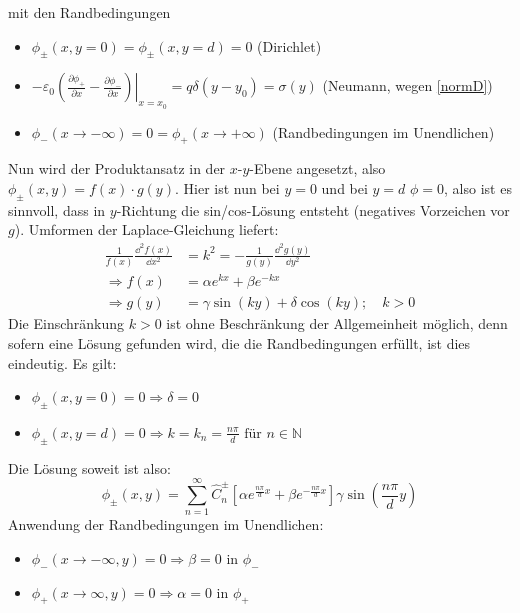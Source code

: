 		   mit den Randbedingungen
		        \begin{itemize}
			        \item $\phi_\pm (x, y=0) = \phi_\pm(x,y=d) = 0 $ (Dirichlet)
			        \item $\left. -\varepsilon_0\left( \frac{\partial \phi_+}{\partial x} -\frac{\partial \phi_-}{\partial x} \right)\right|_{x=x_0} = q\delta(y-y_0)=\sigma(y)$ (Neumann, wegen \ref{normD})
			        \item $\phi_-(x\to-\infty) = 0 = \phi_+(x\to+\infty) $ (Randbedingungen im Unendlichen)
		        \end{itemize}
		   Nun wird der Produktansatz in der $x$-$y$-Ebene angesetzt, also $\phi_\pm(x,y) = f(x)\cdot g(y)$. Hier ist nun bei $y=0$ und bei $y=d$ $\phi=0$, also ist es sinnvoll, dass in $y$-Richtung die sin/cos-Lösung entsteht (negatives Vorzeichen vor $g$). Umformen der Laplace-Gleichung liefert: 
		        \begin{equation}\begin{split}
		        		\frac{1}{f(x)}\frac{\dd^2 f(x)}{\dd x^2}  &= k^2 =  -\frac{1}{g(y)}\frac{\dd^2 g(y)}{\dd y^2}\\
				        \Rightarrow f(x) &= \alpha e^{kx} + \beta e^{-kx} \\
				       \Rightarrow g(y) &= \gamma\sin(ky) + \delta\cos(ky); \quad k>0 
			        \end{split}\end{equation}
		        Die Einschränkung $k>0$ ist ohne Beschränkung der Allgemeinheit möglich, denn sofern eine Lösung gefunden wird, die die Randbedingungen erfüllt, ist dies eindeutig. Es gilt:
		        \begin{itemize}
		        	\item $\phi_\pm(x,y=0) = 0 \Rightarrow {\delta=0}$
		        	\item $\phi_\pm(x,y=d) = 0 \Rightarrow {k=k_n = \frac{n\pi}{d}} \text{ für } n\in\mathbb{N}$
		        \end{itemize}
		   Die Lösung soweit ist also: 
		   \begin{equation}\phi_\pm(x,y) = \sum_{n=1}^\infty \hat{C}_n^\pm \left[\alpha e^{\frac{n\pi}{d} x} + \beta e^{-\frac{n\pi}{d} x}\right]\gamma \sin\left(\frac{n\pi}{d} y\right) 
		   \end{equation}
		   Anwendung der Randbedingungen im Unendlichen:
		   \begin{itemize}
		   	\item $\phi_-(x\to -\infty, y) = 0 \Rightarrow \beta=0$ in $\phi_-$ 
		   	\item $\phi_+(x\to \infty, y) = 0 \Rightarrow \alpha=0$ in $\phi_+$ 
		   \end{itemize}
